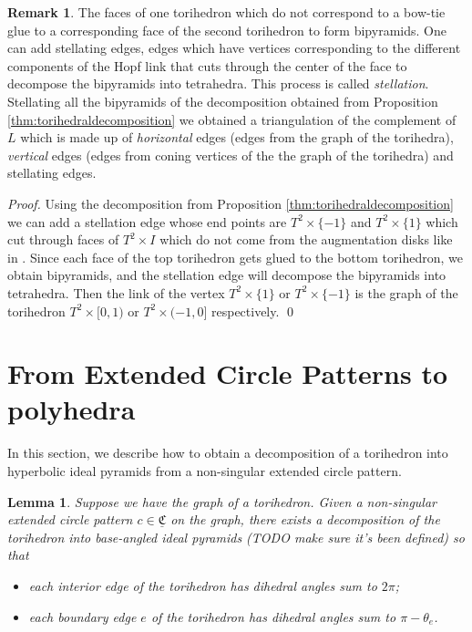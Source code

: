 \documentclass[11pt]{amsart}
\newcommand{\CCC}{{\underline{\mathfrak{C}}}}
\theoremstyle{plain}
\newtheorem{lemma}[theorem]{Lemma}
\theoremstyle{definition}
\newtheorem{remark}[theorem]{Remark}
\begin{document}
\begin{remark}\label{cor:triangulation}
The faces of one torihedron which do not correspond to a bow-tie glue to a
corresponding face of the second torihedron to form bipyramids. One can add
stellating edges, edges which have vertices corresponding to the different
components of the Hopf link that cuts through the center of the face to
decompose the bipyramids into tetrahedra. This process is called {\it
stellation}. Stellating all the bipyramids of the decomposition obtained from
Proposition \ref{thm:torihedraldecomposition} we obtained a triangulation of the
complement of $L$ which is made up of {\it horizontal} edges (edges from the
graph of the torihedra), {\it vertical} edges (edges from coning vertices of the
the graph of the torihedra) and stellating edges.  \end{remark}

{\it Proof.}  Using the decomposition from Proposition
\ref{thm:torihedraldecomposition} we can add a stellation edge whose end points
are $T^2 \times \{-1\}$ and $T^2 \times \{1\}$ which cut through faces of $T^2
\times I$ which do not come from the augmentation disks like in \cite{CKP2}.
Since each face of the top torihedron gets glued to the bottom torihedron, we
obtain bipyramids, and the stellation edge will decompose the bipyramids into
tetrahedra. Then the link of the vertex  $T^2 \times \{1\}$ or $T^2 \times
\{-1\}$ is the graph of the torihedron $T^2 \times [0,1)$ or $T^2 \times (-1,0]$
respectively. \qed



\section{From Extended Circle Patterns to polyhedra}

In this section, we describe how to obtain a
decomposition of a torihedron
into hyperbolic ideal pyramids
from a non-singular extended circle pattern.

\begin{lemma}
Suppose we have the graph of a torihedron.
Given a non-singular extended circle pattern $c \in \CCC$ on the graph,
there exists a decomposition of the torihedron
into base-angled ideal pyramids (TODO make sure it's been defined) so that
	\begin{itemize}
		\item each interior edge of the torihedron has dihedral angles sum to $2\pi$;
		\item each boundary edge $e$ of the torihedron has dihedral angles sum to
			$\pi - \theta_e$.
	\end{itemize}
\end{lemma}
\end{document}
